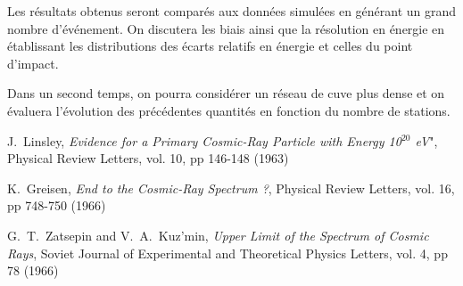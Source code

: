 \documentclass[10pt,a4paper,twoside]{report}
\begin{document}
Les résultats obtenus seront comparés aux données simulées en générant
un grand nombre d'événement. On discutera les biais ainsi que la
résolution en énergie en établissant les distributions des écarts
relatifs en énergie et celles du point d'impact.

Dans un second temps, on pourra considérer un réseau de cuve plus
dense et on évaluera l'évolution des précédentes quantités en
fonction du nombre de stations.

\def\etal{\textit{et al.}}

\renewcommand{\bibname}{References}

\begin{thebibliography}{9}
  

 J.~Linsley, {\em Evidence for a Primary Cosmic-Ray
  Particle with Energy 10$^{20}$ eV}", Physical Review Letters,
  vol. 10, pp 146-148 (1963)

 K.~Greisen, {\em End to the Cosmic-Ray Spectrum ?},
  Physical Review Letters, vol. 16, pp 748-750 (1966)

 G.~T.~Zatsepin and V.~A.~Kuz'min, {\em Upper Limit
  of the Spectrum of Cosmic Rays}, Soviet Journal of Experimental and
  Theoretical Physics Letters, vol. 4, pp 78 (1966)

\end{thebibliography}
\end{document}
